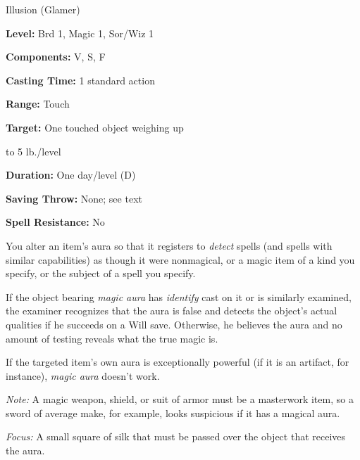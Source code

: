 
Illusion (Glamer)

\textbf{Level:} Brd 1, Magic 1, Sor/Wiz 1

\textbf{Components:} V, S, F

\textbf{Casting Time:} 1 standard action

\textbf{Range:} Touch

\textbf{Target:} One touched object weighing up

to 5 lb./level

\textbf{Duration:} One day/level (D)

\textbf{Saving Throw:} None; see text

\textbf{Spell Resistance:} No

You alter an item's aura so that it registers to \textit{detect} spells (and spells 
with similar capabilities) as though it were nonmagical, or a magic item of a kind 
you specify, or the subject of a spell you specify. 

If the object bearing \textit{magic aura} has \textit{identify} cast on it or is 
similarly examined, the examiner recognizes that the aura is false and detects 
the object's actual qualities if he succeeds on a Will save. Otherwise, he believes 
the aura and no amount of testing reveals what the true magic is.

If the targeted item's own aura is exceptionally powerful (if it is an artifact, 
for instance), \textit{magic aura} doesn't work.

\textit{Note:} A magic weapon, shield, or suit of armor must be a masterwork item, 
so a sword of average make, for example, looks suspicious if it has a magical aura.

\textit{Focus:} A small square of silk that must be passed over the object that 
receives the aura.

